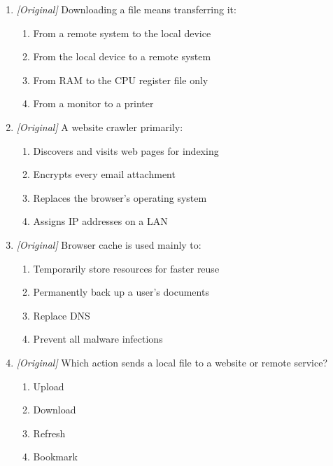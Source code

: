 \begin{enumerate}[label=\textbf{Q\arabic*.}, leftmargin=*]
\begin{enumerate}[label=\Alph*.]
    \item Bookmarks save page addresses for reuse.
    \item Uploading and downloading are the same direction.
  \end{enumerate}
\item \textit{[Original]} Downloading a file means transferring it:
  \begin{enumerate}[label=\Alph*.]
\item From a remote system to the local device
   \item From the local device to a remote system
   \item From RAM to the CPU register file only
   \item From a monitor to a printer
  \end{enumerate}

\item \textit{[Original]} A website crawler primarily:
  \begin{enumerate}[label=\Alph*.]
\item Discovers and visits web pages for indexing
   \item Encrypts every email attachment
   \item Replaces the browser's operating system
   \item Assigns IP addresses on a LAN
  \end{enumerate}

\item \textit{[Original]} Browser cache is used mainly to:
  \begin{enumerate}[label=\Alph*.]
\item Temporarily store resources for faster reuse
   \item Permanently back up a user's documents
   \item Replace DNS
   \item Prevent all malware infections
  \end{enumerate}

\item \textit{[Original]} Which action sends a local file to a website or remote service?
  \begin{enumerate}[label=\Alph*.]
\item Upload
   \item Download
   \item Refresh
   \item Bookmark
  \end{enumerate}


\end{enumerate}

